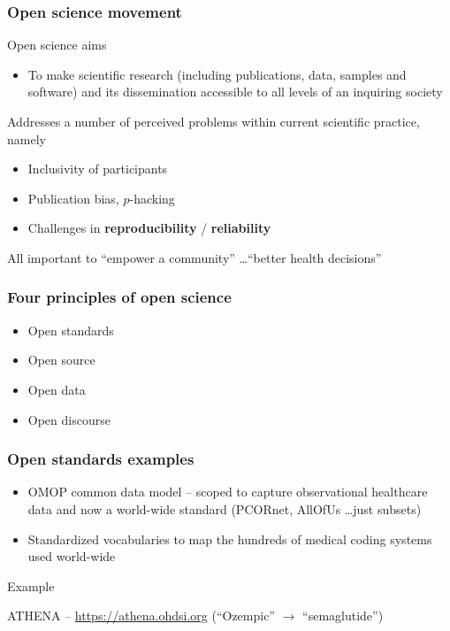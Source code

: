 \documentclass[11pt
,fragile=singleslide
,xcolor=dvipsnames, 
aspectratio=169 %
]{beamer}
\begin{document}
\begin{frame}
  \frametitle{Open science movement}

	\begin{block}{Open science aims}
	\begin{itemize}
	\item To make scientific research (including publications, data, samples and software) and its dissemination accessible to all levels of an inquiring society
\end{itemize}
	\end{block}
  
\vspace{1em}  
  
Addresses a number of perceived problems within current scientific practice, namely
\begin{itemize}
  \item Inclusivity of participants
  \item Publication bias, $p$-hacking
  \item Challenges in \textbf{reproducibility} / \textbf{reliability}
\end{itemize}

\vspace{1em}

All important to ``empower a community'' \ldots ``better health decisions''
  
\end{frame}

\begin{frame}
  \frametitle{Four principles of open science}
  
  \begin{itemize}
    \item Open standards \\[2em]
    \item Open source \\[2em]
    \item Open data \\[2em]
    \item Open discourse
  \end{itemize}
\end{frame}

\begin{frame}
  \frametitle{Open standards examples}

  \begin{itemize}
    \item OMOP common data model -- scoped to capture observational healthcare data and now a world-wide standard (PCORnet, AllOfUs \ldots just subsets)  \\[2em]
    \item Standardized vocabularies to map the hundreds of medical coding systems used world-wide   \\[2em]
  \end{itemize}

\begin{block}{Example}
  \centerline{ATHENA -- \url{https://athena.ohdsi.org} (``Ozempic'' $\rightarrow$ ``semaglutide'')}
\end{block}
\end{frame}
\end{document}
